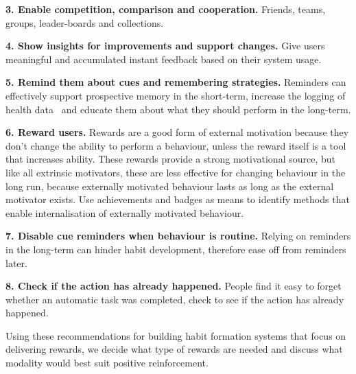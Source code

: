 \textbf{3. Enable competition, comparison and cooperation.}\newline
Friends, teams, groups, leader-boards and collections.


\textbf{4. Show insights for improvements and support changes.}\newline
Give users meaningful and accumulated instant feedback based on their system usage.


\textbf{5. Remind them about cues and remembering strategies.}\newline
Reminders can effectively support prospective memory in the short-term, increase the logging of health data~\cite{the_power_of_logging_mobile_notifications} and educate them about what they should perform in the long-term.


\textbf{6. Reward users.}\newline
Rewards are a good form of external motivation because they don't change the ability to perform a behaviour, unless the reward itself is a tool that increases ability. These rewards provide a strong motivational source, but like all extrinsic motivators, these are less effective for changing behaviour in the long run, because externally motivated behaviour lasts as long as the external motivator exists. Use achievements and badges as means to identify methods that enable internalisation of externally motivated behaviour.


\textbf{7. Disable cue reminders when behaviour is routine.}\newline
Relying on reminders in the long-term can hinder habit development, therefore ease off from reminders later.


\textbf{8. Check if the action has already happened.}\newline
People find it easy to forget whether an automatic task was completed, check to see if the action has already happened.


Using these recommendations for building habit formation systems that focus on delivering rewards, we decide what type of rewards are needed and discuss what modality would best suit positive reinforcement.

